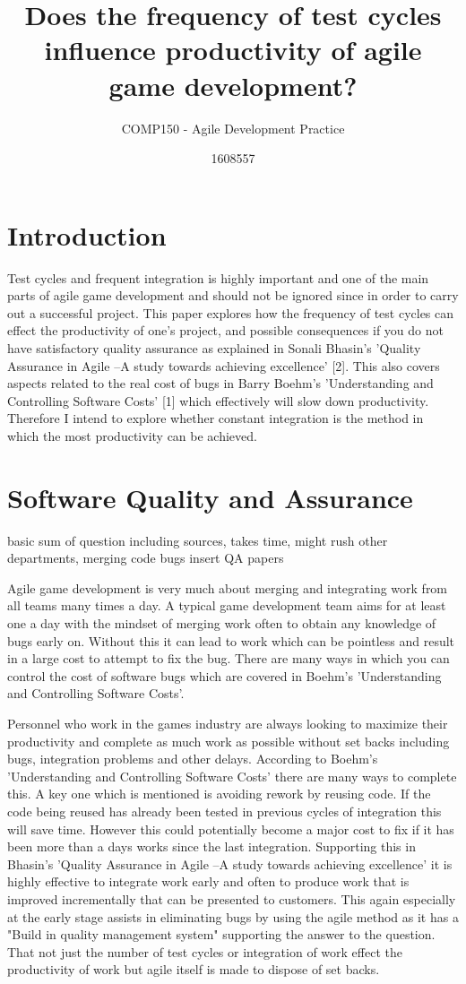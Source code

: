 \documentclass{scrartcl}
\title{Does the frequency of test cycles influence productivity of agile game development? }
\subtitle{COMP150 - Agile Development Practice}
\author{1608557}
\begin{document}
\maketitle



\section{Introduction}

Test cycles and frequent integration is highly important and one of the main parts of agile game development and should not be ignored since in order to carry out a successful project. This paper explores how the frequency of test cycles can effect the productivity of one's project, and possible consequences if you do not have satisfactory quality assurance as explained in Sonali Bhasin's 'Quality Assurance in Agile –A study towards achieving excellence' [2]. This also covers aspects related to the real cost of bugs in Barry Boehm's 'Understanding and Controlling Software Costs' [1]  which effectively will slow down productivity. Therefore I intend to explore whether constant integration is the method in which the most productivity can be achieved. 


\section{Software Quality and Assurance}
basic sum of question including sources, takes time, might rush other 
departments, merging code bugs insert QA papers

Agile game development is very much about merging and integrating work from all teams many times a day. A typical game development team aims for at least one a day with the mindset of merging work often to obtain any knowledge of bugs early on. Without this it can lead to work which can be pointless and result in a large cost to attempt to fix the bug. There are many ways in which you can control the cost of software bugs which are covered in Boehm's 'Understanding and Controlling Software Costs'.  

Personnel who work in the games industry are always looking to maximize their productivity  and complete as much work as possible without set backs including bugs, integration problems and other delays. According to Boehm's 'Understanding and Controlling Software Costs' there are many ways to complete this. A key one which is mentioned is avoiding rework by reusing code. If the code being reused has already been tested in previous cycles of integration this will save time. However this could potentially become a major cost to fix if it has been more than a days works since  the last integration. Supporting this in Bhasin's 'Quality Assurance in Agile –A study towards achieving excellence' it is highly effective to integrate work early and often to produce work that is improved incrementally that can be presented to customers. This again especially at the early stage assists in eliminating bugs by using the agile method as it has a "Build in quality management system" supporting the answer to the question. That not just the number of test cycles or integration of work effect the productivity of work but agile itself is made to dispose of set backs. 
\end{document}
